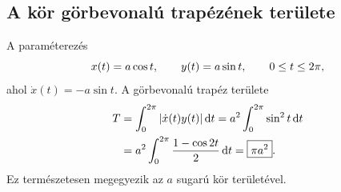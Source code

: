 \documentclass{szb-solution}
\begin{document}
\subsection{A kör görbevonalú trapézének területe}

A paraméterezés
$$
  x(t)=a\cos t,
  \qquad
  y(t)=a\sin t,
  \qquad
  0\leq t\leq2\pi
  \text,
$$
ahol $\dot x(t)=-a\sin t$. A görbevonalú trapéz területe
\begin{align*}
  T
  &=\int_0^{2\pi}|\dot x(t)y(t)|\mathop{}\!\mathrm{d} t
    =a^2\int_0^{2\pi}\sin^2t\mathop{}\!\mathrm{d} t\\
  &=a^2\int_0^{2\pi}\frac{1-\cos2t}{2}\mathop{}\!\mathrm{d} t
    =\boxed{\pi a^2}
  \text.
\end{align*}
Ez természetesen megegyezik az $a$ sugarú kör területével.
\end{document}
